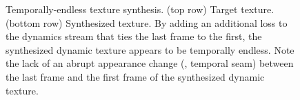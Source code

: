 \begin{figure}[t]
	\centering
	\caption[Temporally-endless texture synthesis]{Temporally-endless texture synthesis. (top row) Target texture. (bottom row) Synthesized texture.
	 By adding an additional loss to the dynamics stream that ties the last frame to the first, the synthesized dynamic texture appears to be temporally endless. Note the lack of an abrupt appearance change (\ie, temporal seam) between the last frame and the first frame of the synthesized dynamic texture.}
	\label{fig:temporally_endless_synthesis}
\end{figure}


